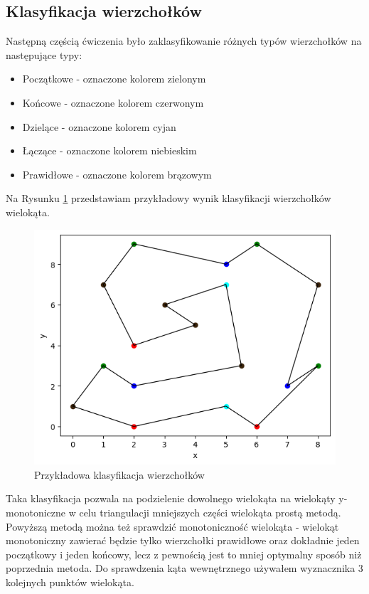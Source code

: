 \documentclass[a4paper]{article}
\begin{document}
    \subsection{Klasyfikacja wierzchołków}
    Następną częścią ćwiczenia było zaklasyfikowanie różnych typów wierzchołków na następujące
    typy:
    \begin{itemize}
        \item Początkowe - oznaczone kolorem zielonym
        \item Końcowe - oznaczone kolorem czerwonym
        \item Dzielące - oznaczone kolorem cyjan
        \item Łączące - oznaczone kolorem niebieskim
        \item Prawidłowe - oznaczone kolorem brązowym 
    \end{itemize} 
    \noindent Na Rysunku \ref{fig:example_vertex_colors} przedstawiam przykładowy wynik klasyfikacji
    wierzchołków wielokąta.
    \begin{figure}[H]
        \centering
        \includegraphics{przykladowa_klasyfikacja.png}
        \caption{Przykładowa klasyfikacja wierzchołków}
        \label{fig:example_vertex_colors}
    \end{figure}
    \noindent Taka klasyfikacja pozwala na podzielenie dowolnego wielokąta na wielokąty y-monotoniczne w
    celu triangulacji mniejszych części wielokąta prostą metodą. Powyższą metodą można też sprawdzić 
    monotoniczność wielokąta - wielokąt monotoniczny zawierać będzie tylko wierzchołki prawidłowe oraz dokładnie
    jeden początkowy i jeden końcowy, lecz z pewnością jest to mniej optymalny sposób niż poprzednia metoda. Do 
    sprawdzenia kąta wewnętrznego używałem wyznacznika 3 kolejnych punktów wielokąta.
\end{document}
